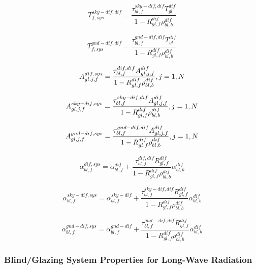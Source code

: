 \begin{equation}
T_{f,sys}^{sky - dif,dif} = \frac{{\tau_{bl,f}^{sky - dif,dif}T_{gl}^{dif}}}{{1 - R_{gl,f}^{dif}\rho_{bl,b}^{dif}}}
\end{equation}

\begin{equation}
T_{f,sys}^{gnd - dif,dif} = \frac{{\tau_{bl,f}^{gnd - dif,dif}T_{gl}^{dif}}}{{1 - R_{gl,f}^{dif}\rho_{bl,b}^{dif}}}
\end{equation}

\begin{equation}
A_{gl,j,f}^{dif,sys} = \frac{{\tau_{bl,f}^{dif,dif}A_{gl,j,f}^{dif}}}{{1 - R_{gl,f}^{dif}\rho_{bl,b}^{dif}}},{\rm{    }}j = 1,N
\end{equation}

\begin{equation}
A_{gl,j,f}^{sky - dif,sys} = \frac{{\tau_{bl,f}^{sky - dif,dif}A_{gl,j,f}^{dif}}}{{1 - R_{gl,f}^{dif}\rho_{bl,b}^{dif}}},{\rm{    }}j = 1,N
\end{equation}

\begin{equation}
A_{gl,j,f}^{gnd - dif,sys} = \frac{{\tau_{bl,f}^{gnd - dif,dif}A_{gl,j,f}^{dif}}}{{1 - R_{gl,f}^{dif}\rho_{bl,b}^{dif}}},{\rm{    }}j = 1,N
\end{equation}

\begin{equation}
\alpha_{bl,f}^{dif,sys} = \alpha_{bl,f}^{dif} + \frac{{\tau_{bl,f}^{dif,dif}R_{gl,f}^{dif}}}{{1 - R_{gl,f}^{dif}\rho_{bl,b}^{dif}}}\alpha_{bl,b}^{dif}
\end{equation}

\begin{equation}
\alpha_{bl,f}^{sky - dif,sys} = \alpha_{bl,f}^{sky - dif} + \frac{{\tau_{bl,f}^{sky - dif,dif}R_{gl,f}^{dif}}}{{1 - R_{gl,f}^{dif}\rho_{bl,b}^{dif}}}\alpha_{bl,b}^{dif}
\end{equation}

\begin{equation}
\alpha_{bl,f}^{gnd - dif,sys} = \alpha_{bl,f}^{gnd - dif} + \frac{{\tau_{bl,f}^{gnd - dif,dif}R_{gl,f}^{dif}}}{{1 - R_{gl,f}^{dif}\rho_{bl,b}^{dif}}}\alpha_{bl,b}^{dif}
\end{equation}

\subsubsection{Blind/Glazing System Properties for Long-Wave Radiation}\label{blindglazing-system-properties-for-long-wave-radiation}


